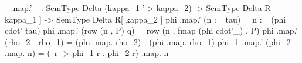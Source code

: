\begin{agdaf}
_.map.'_ : SemType Delta (kappa_1 '-> kappa_2) -> SemType Delta R[ kappa_1 ] -> 
       SemType Delta R[ kappa_2 ]
phi .map.' (n := tau) = n := (phi cdot' tau)
phi .map.' (row (n , P) q) = row (n , fmap (phi cdot'_) . P)
phi .map.' (rho_2 - rho_1) = (phi .map. rho_2) - (phi .map. rho_1)
phi_1 .map.' (phi_2 .map. n) = (\ r -> phi_1 r . phi_2 r) .map. n
\end{agdaf}
